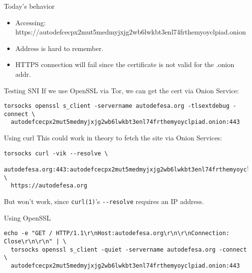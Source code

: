 \documentclass[
  ignorenonframetext,
]{beamer}
\providecommand{\tightlist}{%
  \setlength{\itemsep}{0pt}\setlength{\parskip}{0pt}}
\begin{document}
\begin{frame}{Today's behavior}
\protect\hypertarget{todays-behavior}{}
\begin{itemize}
\tightlist
\item
  Accessing:
  https://autodefcecpx2mut5medmyjxjg2wb6lwkbt3enl74frthemyoyclpiad.onion
\item
  Address is hard to remember.
\item
  HTTPS connection will fail since the certificate is not valid for the
  .onion addr.
\end{itemize}
\end{frame}

\begin{frame}[fragile]{Testing SNI}
\protect\hypertarget{testing-sni}{}
If we use OpenSSL via Tor, we can get the cert via Onion Service:

\begin{verbatim}
torsocks openssl s_client -servername autodefesa.org -tlsextdebug -connect \
  autodefcecpx2mut5medmyjxjg2wb6lwkbt3enl74frthemyoyclpiad.onion:443
\end{verbatim}
\end{frame}

\begin{frame}[fragile]{Using curl}
\protect\hypertarget{using-curl}{}
This could work in theory to fetch the site via Onion Services:

\begin{verbatim}
torsocks curl -vik --resolve \
  autodefesa.org:443:autodefcecpx2mut5medmyjxjg2wb6lwkbt3enl74frthemyoyclpiad.onion \
  https://autodefesa.org
\end{verbatim}

But won't work, since \texttt{curl(1)}'s \texttt{-\/-resolve} requires
an IP address.
\end{frame}

\begin{frame}[fragile]{Using OpenSSL}
\protect\hypertarget{using-openssl}{}
\begin{verbatim}
echo -e "GET / HTTP/1.1\r\nHost:autodefesa.org\r\n\r\nConnection: Close\r\n\r\n" | \
  torsocks openssl s_client -quiet -servername autodefesa.org -connect \
  autodefcecpx2mut5medmyjxjg2wb6lwkbt3enl74frthemyoyclpiad.onion:443
\end{verbatim}
\end{frame}
\end{document}
